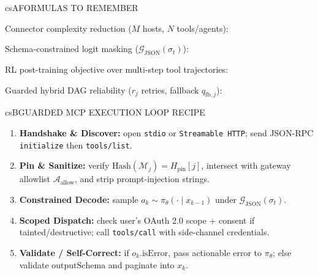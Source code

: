 \documentclass[../../../../master.tex]{subfiles}
\begin{document}
\begin{cscolumns}
\begin{cscard}{csA}{FORMULAS TO REMEMBER}
  \begin{csbul}
    \item Connector complexity reduction ($M$ hosts, $N$ tools/agents):
    \item Schema-constrained logit masking ($\mathcal{G}_{\text{JSON}}(\sigma_t)$):
    \item RL post-training objective over multi-step tool trajectories:
    \item Guarded hybrid DAG reliability ($r_j$ retries, fallback $q_{\text{fb},j}$):
  \end{csbul}
\end{cscard}

\begin{cscard}{csB}{GUARDED MCP EXECUTION LOOP RECIPE}
  \begin{enumerate}[leftmargin=1.2em, itemsep=1pt, topsep=1pt, parsep=0pt]
    \item \textbf{Handshake \& Discover:} open \texttt{stdio} or \texttt{Streamable HTTP}; send JSON-RPC \texttt{initialize} then \texttt{tools/list}.
    \item \textbf{Pin \& Sanitize:} verify $\mathrm{Hash}(\mathcal{M}_j)=H_{\text{pin}}[j]$, intersect with gateway allowlist $\mathcal{A}_{\text{allow}}$, and strip prompt-injection strings.
    \item \textbf{Constrained Decode:} sample $a_k\sim\pi_\theta(\cdot\mid x_{k-1})$ under $\mathcal{G}_{\text{JSON}}(\sigma_t)$.
    \item \textbf{Scoped Dispatch:} check user's OAuth 2.0 scope + consent if tainted/destructive; call \texttt{tools/call} with side-channel credentials.
    \item \textbf{Validate / Self-Correct:} if $o_k.\text{isError}$, pass actionable error to $\pi_\theta$; else validate $\text{outputSchema}$ and paginate into $x_k$.
  \end{enumerate}
\end{cscard}
\columnbreak


\end{cscolumns}
\end{document}
